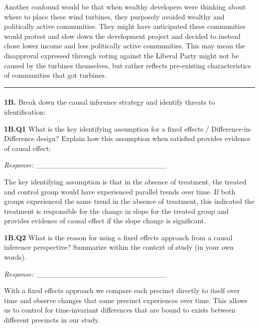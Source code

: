 \documentclass[
  letterpaper,
  DIV=11,
  numbers=noendperiod]{scrartcl}
\makeatletter
\let\oldparagraph\paragraph
\renewcommand{\paragraph}{
    \@ifstar
      \xxxParagraphStar
      \xxxParagraphNoStar
  }
\newcommand{\xxxParagraphStar}[1]{\oldparagraph*{#1}\mbox{}}
\newcommand{\xxxParagraphNoStar}[1]{\oldparagraph{#1}\mbox{}}
\makeatother
\begin{document}
Another confound would be that when wealthy developers were thinking
about where to place these wind turbines, they purposely avoided wealthy
and politically active communities. They might have anticipated these
communities would protest and slow down the development project and
decided to instead chose lower income and less politically active
communities. This may mean the disapproval expressed through voting
against the Liberal Party might not be caused by the turbines
themselves, but rather reflects pre-existing characteristics of
communities that got turbines.

\begin{center}\rule{0.5\linewidth}{0.5pt}\end{center}

\paragraph{\texorpdfstring{\textbf{1B.} Break down the causal inference
strategy and identify threats to
identification:}{1B. Break down the causal inference strategy and identify threats to identification:}}\label{b.-break-down-the-causal-inference-strategy-and-identify-threats-to-identification}

\textbf{1B.Q1} What is the key identifying assumption for a fixed
effects / Difference-in-Difference design? Explain how this assumption
when satisfied provides evidence of causal effect:

\emph{Response:} \_\_\_\_\_\_\_\_\_\_\_\_\_\_\_\_\_\_\_\_\_\_\_\_\_

The key identifying assumption is that in the absence of treatment, the
treated and control group would have experienced parallel trends over
time. If both groups experienced the same trend in the absence of
treatment, this indicated the treatment is responsible for the change in
slope for the treated group and provides evidence of causal effect if
the slope change is significant.

\textbf{1B.Q2} What is the reason for using a fixed effects approach
from a causal inference perspective? Summarize within the context of
study (in your own words).

\emph{Response:} \_\_\_\_\_\_\_\_\_\_\_\_\_\_\_\_\_\_\_\_\_\_\_\_\_

With a fixed effects approach we compare each precinct directly to
itself over time and observe changes that same precinct experiences over
time. This allows us to control for time-invariant differences that are
bound to exists between different precincts in our study.
\end{document}
